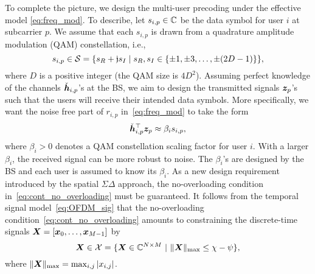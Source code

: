\documentclass[10pt,twocolumn,twoside]{IEEEtran}
\begin{document}
To complete the picture, we design the multi-user precoding under the effective model \eqref{eq:freq_mod}.
To describe,
let $s_{i,p} \in \mathbb{C}$ be the data symbol for user $i$ at subcarrier $p$.
We assume that each $s_{i,p}$ is drawn from a quadrature amplitude modulation (QAM) constellation, i.e.,
\begin{equation*}\label{eq:QAM_cons}
	s_{i,p} \in \mathcal{S} = \{ s_R + {\mathfrak j} s_I  \mid  s_R, s_I \in \{ \pm 1, \pm 3, \ldots, \pm (2D - 1) \} \},
\end{equation*}
where $D$ is a positive integer (the QAM size is $4D^2$).
Assuming perfect knowledge of the channels $\check {{\bm h}}_{i,p}$'s at the BS, we aim to design the transmitted signals ${\bm z}_p$'s such that the users will receive their intended data symbols.
More specifically, we want the noise free part of $r_{i,p}$ in~\eqref{eq:freq_mod} to take the form
\begin{equation}\label{eq:symbol_shaping}
	\check {{\bm h}}_{i,p}^\top {\bm z}_p \approx \beta_i s_{i,p},
\end{equation}
where $\beta_i>0$ denotes a QAM constellation scaling factor for user $i$.
With a larger $\beta_i$, the received signal can be more robust to noise.
The $\beta_i$'s are designed by the BS and each user is assumed to know its $\beta_i$.
As a new design requirement introduced by the spatial $\Sigma \Delta$ approach, the no-overloading condition in~\eqref{eq:cont_no_overloading} must be guaranteed.
It follows from the temporal signal model~\eqref{eq:OFDM_sig} that the no-overloading condition~\eqref{eq:cont_no_overloading} amounts to constraining the discrete-time signals ${\bm X} = [{\bm x}_0, \dots, {\bm x}_{M-1}]$ by
\begin{equation}\label{eq:no_overloading}
{\bm X} \in \mathcal{X} = \{ {\bm X} \in \mathbb{C}^{N \times M} ~\vert~	\|{\bm X}\|_{\rm max} \le \chi - \psi \},
\end{equation}
where
$\|{\bm X}\|_{\rm max} = \max_{i,j}|x_{i,j}|$.
\end{document}
